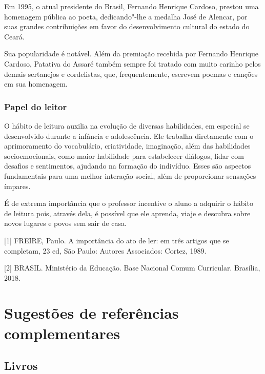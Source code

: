 \documentclass[12pt]{extarticle}
\begin{document}

Em 1995, o atual presidente do Brasil, Fernando Henrique Cardoso,
prestou uma homenagem pública ao poeta, dedicando"-lhe a medalha José de
Alencar, por suas grandes contribuições em favor do desenvolvimento
cultural do estado do Ceará.

Sua popularidade é notável. Além da premiação recebida por Fernando
Henrique Cardoso, Patativa do Assaré também sempre foi tratado com muito
carinho pelos demais sertanejos e cordelistas, que, frequentemente,
escrevem poemas e canções em sua homenagem.


\subsubsection{{Papel do leitor}}

O hábito de leitura auxilia na evolução de diversas habilidades, em
especial se desenvolvido durante a infância e adolescência. Ele trabalha
diretamente com o aprimoramento do vocabulário, criatividade,
imaginação, além das habilidades socioemocionais, como maior habilidade
para estabelecer diálogos, lidar com desafios e sentimentos, ajudando na
formação do indivíduo. Esses são aspectos fundamentais para uma melhor
interação social, além de proporcionar sensações ímpares.

É de extrema importância que o professor incentive o aluno a adquirir o
hábito de leitura pois, através dela, é possível que ele aprenda, viaje
e descubra sobre novos lugares e povos sem sair de casa.

{[}1{]} FREIRE, Paulo. A importância do ato de ler: em três artigos que
se completam, 23 ed, São Paulo: Autores Associados: Cortez, 1989.

{[}2{]} BRASIL. Ministério da Educação. Base Nacional Comum Curricular.
Brasília, 2018.

\section{Sugestões de referências complementares}


\subsection{Livros}
\end{document}
